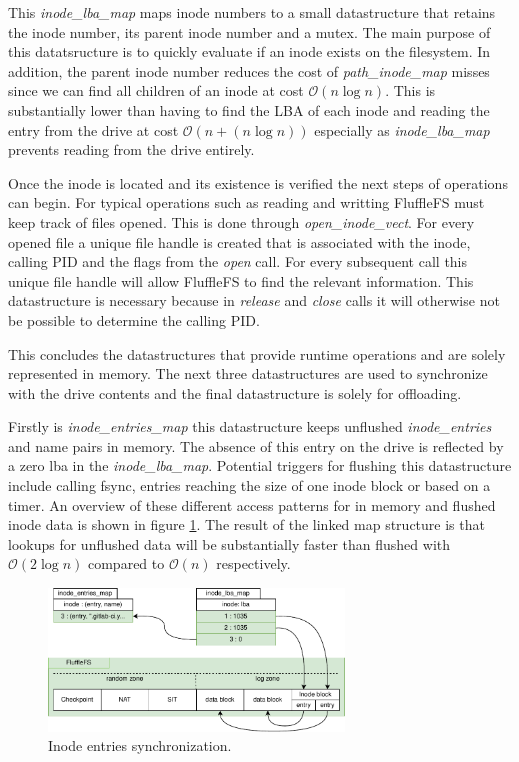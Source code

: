 This \textit{inode\_lba\_map} maps inode numbers to a small datastructure that
retains the inode number, its parent inode number and a mutex. The main purpose
of this datatsructure is to quickly evaluate if an inode exists on the
filesystem. In addition, the parent inode number reduces the cost of
\textit{path\_inode\_map} misses since we can find all children of an inode at
cost $\mathcal{O}(n \log n)$. This is substantially lower than having to find
the LBA of each inode and reading the entry from the drive at cost
$\mathcal{O}(n + (n \log n))$ especially as \textit{inode\_lba\_map} prevents
reading from the drive entirely.

Once the inode is located and its existence is verified the next steps of
operations can begin. For typical operations such as reading and writting
FluffleFS must keep track of files opened. This is done through
\textit{open\_inode\_vect}. For every opened file a unique file handle is
created that is associated with the inode, calling PID and the flags from the
\textit{open} call. For every subsequent call this unique file handle will allow
FluffleFS to find the relevant information. This datastructure is necessary
because in \textit{release} and \textit{close} calls it will otherwise not be
possible to determine the calling PID.

This concludes the datastructures that provide runtime operations and are solely
represented in memory. The next three datastructures are used to synchronize
with the drive contents and the final datastructure is solely for offloading.

Firstly is \textit{inode\_entries\_map} this datastructure keeps unflushed
\textit{inode\_entries} and name pairs in memory. The absence of this entry on
the drive is reflected by a zero lba in the \textit{inode\_lba\_map}. Potential
triggers for flushing this datastructure include calling fsync, entries reaching
the size of one inode block or based on a timer. An overview of these different
access patterns for in memory and flushed inode data is shown in figure
\ref{figure:fluffleinodesync}. The result of the linked map structure is that
lookups for unflushed data will be substantially faster than flushed
with $\mathcal{O}(2 \log n)$ compared to $\mathcal{O}(n)$ respectively.

\begin{figure}[h!]
    \centering
	\includegraphics[width=0.7\textwidth]{resources/images/fluffle-inode-sync.pdf}
	\caption{Inode entries synchronization.}
    \label{figure:fluffleinodesync}
\end{figure}

